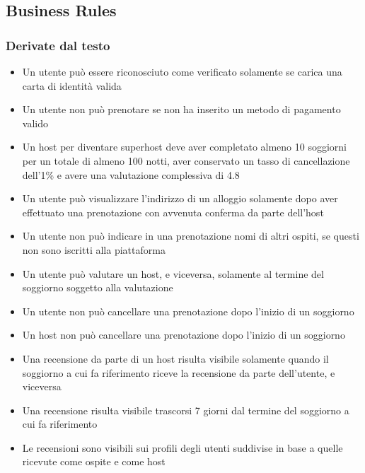 \subsection{Business Rules}
\subsubsection{Derivate dal testo}
\begin{itemize}
  \item Un utente può essere riconosciuto come verificato solamente se carica una carta di identità valida
  \item Un utente non può prenotare se non ha inserito un metodo di pagamento valido
  \item Un host per diventare superhost deve aver completato almeno 10 soggiorni per un totale di almeno 100 notti, aver conservato un tasso di cancellazione dell'1\% e avere una valutazione complessiva di 4.8 
  \item Un utente può visualizzare l'indirizzo di un alloggio solamente dopo aver effettuato una prenotazione con avvenuta conferma da parte dell'host
  \item Un utente non può indicare in una prenotazione nomi di altri ospiti, se questi non sono iscritti alla piattaforma 
  \item Un utente può valutare un host, e viceversa, solamente al termine del soggiorno soggetto alla valutazione
  \item Un utente non può cancellare una prenotazione dopo l'inizio di un soggiorno
  \item Un host non può cancellare una prenotazione dopo l'inizio di un soggiorno
  \item Una recensione da parte di un host risulta visibile solamente quando il soggiorno a cui fa riferimento riceve la recensione da parte dell'utente, e viceversa
  \item Una recensione risulta visibile trascorsi 7 giorni dal termine del soggiorno a cui fa riferimento
  \item Le recensioni sono visibili sui profili degli utenti suddivise in base a quelle ricevute come ospite e come host
\end{itemize}

